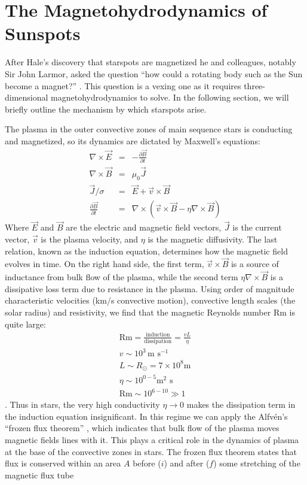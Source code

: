 \section{The Magnetohydrodynamics of Sunspots} \label{intro:mhd}

After Hale's discovery that starspots are magnetized he and colleagues, notably Sir John Larmor, asked the question ``how could a rotating body such as the Sun become a magnet?'' \citep{Larmor1919}. This question is a vexing one as it requires three-dimensional magnetohydrodynamics to solve. In the following section, we will briefly outline the mechanism by which starspots arise. 

The plasma in the outer convective zones of main sequence stars is conducting and magnetized, so its dynamics are dictated by Maxwell's equations: 
\begin{eqnarray}
\nabla \times \vec{E} &=& -\frac{\partial \vec{B}}{\partial t}\\
\nabla \times \vec{B} &=& \mu_0 \vec{J}\\
\vec{J}/\sigma &=& \vec{E} + \vec{v} \times \vec{B}\\
\frac{\partial \vec{B}}{\partial t} &=& \nabla \times \left( \vec{v} \times \vec{B} - \eta \nabla \times \vec{B} \right)
\end{eqnarray}
Where $\vec{E}$ and $\vec{B}$ are the electric and magnetic field vectors, $\vec{J}$ is the current vector, $\vec{v}$ is the plasma velocity, and $\eta$ is the magnetic diffusivity. The last relation, known as the induction equation, determines how the magnetic field evolves in time. On the right hand side, the first term, $\vec{v} \times \vec{B}$ is a source of inductance from bulk flow of the plasma, while the second term $\eta \nabla \times \vec{B}$ is a dissipative loss term due to resistance in the plasma. Using order of magnitude characteristic velocities (km/s convective motion), convective length scales (the solar radius) and resistivity, we find that the magnetic Reynolds number Rm is quite large:
\begin{eqnarray}
\textrm{Rm} = \frac{\textrm{induction}}{\textrm{dissipation}} = \frac{v L}{\eta}\\
v \sim 10^3\, \textrm{m s}^{-1}\\
L \sim R_\odot = 7 \times 10^8 \textrm{m}\\
\eta \sim 10^{0-5} \textrm{m$^2$ s}\\
\textrm{Rm} \sim 10^{6 - 10} \gg 1
\end{eqnarray}
\citep{Ossendrijver2003}. Thus in stars, the very high conductivity $\eta \rightarrow 0$ makes the dissipation term in the induction equation insignificant. In this regime we can apply the Alfv{\'e}n's ``frozen flux theorem'' \citep{Alfven1942}, which indicates that bulk flow of the plasma moves magnetic fields lines with it. This plays a critical role in the dynamics of plasma at the base of the convective zones in stars. The frozen flux theorem states that flux is conserved within an area $A$ before ($i$) and after ($f$) some stretching of the magnetic flux tube  

